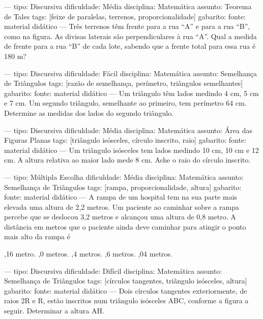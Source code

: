 
---
tipo: Discursiva
dificuldade: Média
disciplina: Matemática
assunto: Teorema de Tales
tags: [feixe de paralelas, terrenos, proporcionalidade]
gabarito:
fonte: material didático
---
\question
Três terrenos têm frente para a rua “A” e para a rua “B”, como na figura. As divisas laterais são perpendiculares à rua “A”. Qual a medida de frente para a rua “B” de cada lote, sabendo que a frente total para essa rua é 180 m?


---
tipo: Discursiva
dificuldade: Fácil
disciplina: Matemática
assunto: Semelhança de Triângulos
tags: [razão de semelhança, perímetro, triângulos semelhantes]
gabarito:
fonte: material didático
---
\question
Um triângulo têm lados medindo 4 cm, 5 cm e 7 cm. Um segundo triângulo, semelhante ao primeiro, tem perímetro 64 cm. Determine as medidas dos lados do segundo triângulo.

---
tipo: Discursiva
dificuldade: Média
disciplina: Matemática
assunto: Área das Figuras Planas
tags: [triângulo isósceles, círculo inscrito, raio]
gabarito:
fonte: material didático
---
\question
Um triângulo isósceles tem lados medindo 10 cm, 10 cm e 12 cm. A altura relativa ao maior lado mede 8 cm. Ache o raio do círculo inscrito.

---
tipo: Múltipla Escolha
dificuldade: Média
disciplina: Matemática
assunto: Semelhança de Triângulos
tags: [rampa, proporcionalidade, altura]
gabarito:
fonte: material didático
---
\question
A rampa de um hospital tem na sua parte mais elevada uma altura de 2,2 metros. Um paciente ao caminhar sobre a rampa percebe que se deslocou 3,2 metros e alcançou uma altura de 0,8 metro.
A distância em metros que o paciente ainda deve caminhar para atingir o ponto mais alto da rampa é
\begin{choices}
,16 metro.
,0 metros.
,4 metros.
,6 metros.
,04 metros.
\end{choices}

---
tipo: Discursiva
dificuldade: Difícil
disciplina: Matemática
assunto: Semelhança de Triângulos
tags: [círculos tangentes, triângulo isósceles, altura]
gabarito:
fonte: material didático
---
\question
Dois círculos tangentes exteriormente, de raios 2R e R, estão inscritos num triângulo isósceles ABC, conforme a figura a seguir. Determinar a altura AH.


